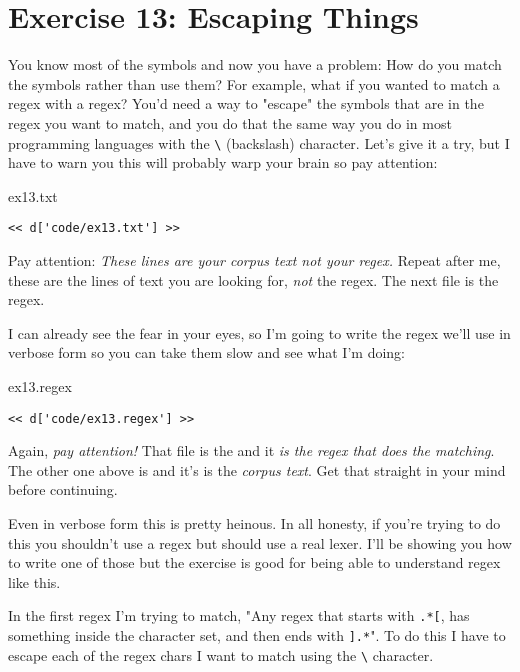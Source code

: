 \chapter{Exercise 13: Escaping Things}

You know most of the symbols and now you have a problem:  How do you match
the symbols rather than use them?  For example, what if you wanted to match a
regex with a regex?  You'd need a way to "escape" the symbols that are in the
regex you want to match, and you do that the same way you do in most
programming languages with the \verb|\| (backslash) character.  Let's give
it a try, but I have to warn you this will probably warp your brain so pay
attention:

\begin{code}{ex13.txt}
\begin{Verbatim}
<< d['code/ex13.txt'] >>
\end{Verbatim}
\end{code}

Pay attention: \emph{These lines are your corpus text not your regex.} Repeat
after me, these are the lines of text you are looking for, \emph{not} the
regex.  The next file is the regex.

I can already see the fear in your eyes, so I'm going to write the regex
we'll use in verbose form so you can take them slow and see what I'm doing:

\begin{code}{ex13.regex}
\begin{Verbatim}
<< d['code/ex13.regex'] >>
\end{Verbatim}
\end{code}

Again, \emph{pay attention!} That file is the  and it \emph{is
the regex that does the matching}. The other one above is  and
it's is the \emph{corpus text}.  Get that straight in your mind before continuing.

Even in verbose form this is pretty heinous.  In all honesty, if you're
trying to do this you shouldn't use a regex but should use a real lexer.
I'll be showing you how to write one of those but the exercise is good for
being able to understand regex like this.

In the first regex I'm trying to match, "Any regex that starts with \verb|.*[|,
has something inside the character set, and then ends with \verb|].*|".  To do
this I have to escape each of the regex chars I want to match using the \verb|\|
character.

